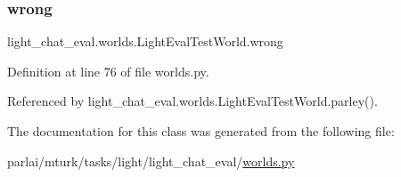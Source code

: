 \subsubsection{\texorpdfstring{wrong}{wrong}}
{\footnotesize\ttfamily light\+\_\+chat\+\_\+eval.\+worlds.\+Light\+Eval\+Test\+World.\+wrong}



Definition at line 76 of file worlds.\+py.



Referenced by light\+\_\+chat\+\_\+eval.\+worlds.\+Light\+Eval\+Test\+World.\+parley().



The documentation for this class was generated from the following file\+:\begin{DoxyCompactItemize}
\item 
parlai/mturk/tasks/light/light\+\_\+chat\+\_\+eval/\hyperlink{parlai_2mturk_2tasks_2light_2light__chat__eval_2worlds_8py}{worlds.\+py}\end{DoxyCompactItemize}
